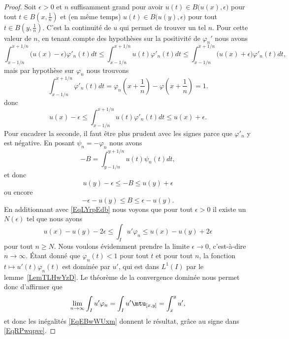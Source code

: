 \begin{proof}
    Soit \( \epsilon>0\) et \( n\) suffisamment grand pour avoir \( u(t)\in B\big( u(x),\epsilon \big)\) pour tout \( t\in B(x,\frac{1}{ n })\) et (en même temps) \( u(t)\in B\big( u(y),\epsilon \big)\) pour tout \( t\in B(y,\frac{1}{ n })\). C'est la continuité de \( u\) qui permet de trouver un tel \( n\). Pour cette valeur de \( n\), en tenant compte des hypothèses sur la positivité de \( \varphi_n'\) nous avons
    \begin{equation}
        \int_{x-1/n}^{x+1/n}\big( u(x)-\epsilon \big)\varphi'_n(t)dt\leq\int_{x-1/n}^{x+1/n}u(t)\varphi'_n(t)dt\leq\int_{x-1/n}^{x+1/n}\big( u(x)+\epsilon \big)\varphi'_n(t)dt,
    \end{equation}
    mais par hypothèse sur \( \varphi_n\) nous trouvons
    \begin{equation}
        \int_{x-1/n}^{x+1/n}\varphi'_n(t)dt=\varphi_n(x+\frac{1}{ n })-\varphi(x+\frac{1}{ n })=1.
    \end{equation}
    donc
    \begin{equation}    \label{EqLYrpEdb}
        u(x)-\epsilon\leq\int_{x-1/n}^{x+1/n}u(t)\varphi'_n(t)dt\leq u(x)+\epsilon.
    \end{equation}
    Pour encadrer la seconde, il faut être plus prudent avec les signes parce que \( \varphi'_n\) y est négative. En posant \( \psi_n=-\varphi_n\) nous avons
    \begin{equation}
        -B=\int_{y-1/n}^{y+1/n}u(t)\psi_n(t)dt,
    \end{equation}
    et donc
    \begin{equation}
        u(y)-\epsilon\leq -B\leq u(y)+\epsilon
    \end{equation}
    ou encore
    \begin{equation}
        -\epsilon-u(y)\leq B\leq \epsilon-u(y).
    \end{equation}
    En additionnant avec \eqref{EqLYrpEdb} nous voyons que pour tout \( \epsilon>0\) il existe un \( N(\epsilon)\) tel que nous ayons
    \begin{equation}    \label{EqEBwWUxm}
        u(x)-u(y)-2\epsilon\leq\int_Iu'\varphi_{n}\leq u(x)-u(y)+2\epsilon
    \end{equation}
    pour tout \( n\geq N\). Nous voulons évidemment prendre la limite \( \epsilon\to 0\), c'est-à-dire \( n\to \infty\). Étant donné que \( \varphi_n(t)<1\) pour tout \( t\) et pour tout \( n\), la fonction \( t\mapsto u'(t)\varphi_n(t)\) est dominée par \( u'\), qui est dans \( L^1(I)\) par le lemme~\ref{LemTLHwYzD}. Le théorème de la convergence dominée nous permet donc d'affirmer que
    \begin{equation}
        \lim_{n\to \infty} \int_Iu'\varphi_n=\int_Iu'\mtu_{[x,y]}=\int_x^yu',
    \end{equation}
    et donc les inégalités \eqref{EqEBwWUxm} donnent le résultat, grâce au signe dans \eqref{EqRPwqpve}.
\end{proof}

